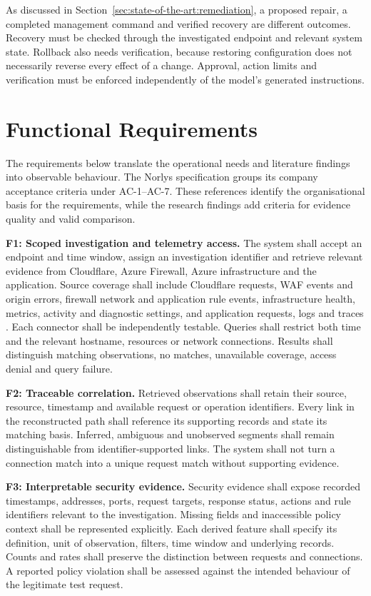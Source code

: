 As discussed in Section~\ref{sec:state-of-the-art:remediation}, a proposed
repair, a completed management command and verified recovery are different
outcomes. Recovery must be checked through the investigated endpoint and
relevant system state. Rollback also needs verification, because restoring
configuration does not necessarily reverse every effect of a change.
Approval, action limits and verification must be enforced independently of
the model's generated instructions.

\section{Functional Requirements}
\label{sec:requirements:functional}

The requirements below translate the operational needs and literature
findings into observable behaviour. The Norlys specification groups its
company acceptance criteria under AC-1--AC-7. These references identify
the organisational basis for the requirements, while the research findings
add criteria for evidence quality and valid comparison.

\noindent\textbf{F1: Scoped investigation and telemetry access.}
The system shall accept an endpoint and time window, assign an investigation
identifier and retrieve relevant evidence from Cloudflare, Azure Firewall,
Azure infrastructure and the application. Source coverage shall include
Cloudflare requests, WAF events and origin errors, firewall network and
application rule events, infrastructure health, metrics, activity and
diagnostic settings, and application requests, logs and traces
\parencite[AC-3, AC-4]{norlys_operations_agents}.
Each connector shall be independently testable. Queries shall restrict both
time and the relevant hostname, resources or network connections. Results
shall distinguish matching observations, no matches, unavailable coverage,
access denial and query failure.

\noindent\textbf{F2: Traceable correlation.}
Retrieved observations shall retain their source, resource, timestamp and
available request or operation identifiers. Every link in the reconstructed
path shall reference its supporting records and state its matching basis.
Inferred, ambiguous and unobserved segments shall remain distinguishable
from identifier-supported links. The system shall not turn a connection
match into a unique request match without supporting evidence.

\noindent\textbf{F3: Interpretable security evidence.}
Security evidence shall expose recorded timestamps, addresses, ports,
request targets, response status, actions and rule identifiers relevant to
the investigation. Missing fields and inaccessible policy context shall
be represented explicitly. Each derived feature shall specify its
definition, unit of observation, filters, time window and underlying
records. Counts and rates shall preserve the distinction between requests
and connections. A reported policy violation shall be assessed against
the intended behaviour of the legitimate test request.

